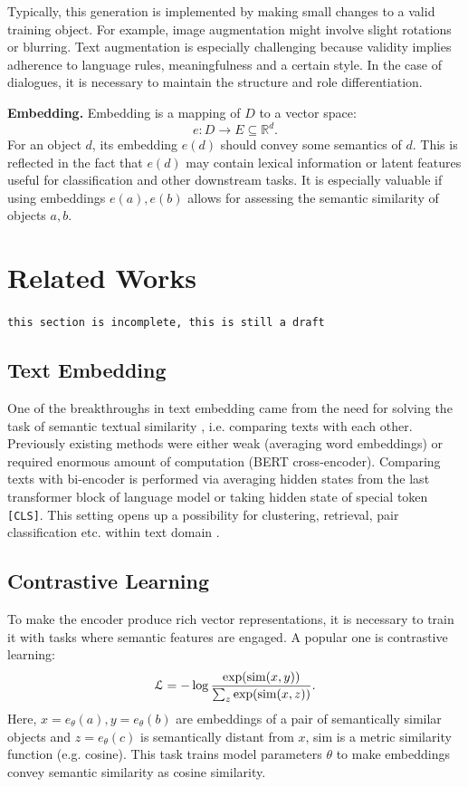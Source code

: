 \documentclass{article}
\begin{document}
Typically, this generation is implemented by making small changes to a valid training object. For example, image augmentation might involve slight rotations or blurring. Text augmentation is especially challenging because validity implies adherence to language rules, meaningfulness and a certain style. In the case of dialogues, it is necessary to maintain the structure and role differentiation.

\textbf{Embedding.} Embedding is a mapping of $D$ to a vector space:
$$
e:D\to E\subseteq\mathbb{R}^d.
$$
For an object $d$, its embedding $e(d)$ should convey some semantics of $d$. This is reflected in the fact that $e(d)$ may contain lexical information or latent features useful for classification and other downstream tasks. It is especially valuable if using embeddings $e(a), e(b)$ allows for assessing the semantic similarity of objects $a, b$.

\section{Related Works}

\texttt{this section is incomplete, this is still a draft }

\subsection{Text Embedding}

One of the breakthroughs in text embedding came from the need for solving the task of semantic textual similarity \cite{reimers2019sentencebert}, i.e. comparing texts with each other. Previously existing methods were either weak (averaging word embeddings) or required enormous amount of computation (BERT cross-encoder). Comparing texts with bi-encoder is performed via averaging hidden states from the last transformer block of language model or taking hidden state of special token \texttt{[CLS]}. This setting opens up a possibility for clustering, retrieval, pair classification etc. within text domain \cite{muennighoff2023mteb}.

\subsection{Contrastive Learning}

To make the encoder produce rich vector representations, it is necessary to train it with tasks where semantic features are engaged. A popular one is contrastive learning:
$$
\mathcal{L}=-\log{\exp(\text{sim}(x,y))\over\sum_{z}\exp(\text{sim}(x,z))}.
$$
Here, $x=e_\theta(a), y=e_\theta(b)$ are embeddings of a pair of semantically similar objects and $z=e_\theta(c)$ is semantically distant from $x$, sim is a metric similarity function (e.g. cosine). This task trains model parameters $\theta$ to make embeddings convey semantic similarity as cosine similarity. 
\end{document}
